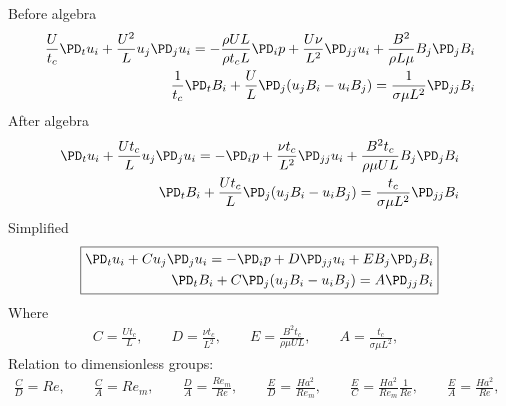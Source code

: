\documentclass[11pt]{article}
\begin{document}
Before algebra
\begin{equation}\begin{aligned}
\frac{U}{t_c} \PD_t u_i+ \frac{U^2}{L} u_j\PD_j u_i =-\frac{\rho U L}{\rho t_c L}\PD_i p+ \frac{U \nu}{L^2} \PD_{jj} u_i + \frac{B^2}{\rho L \mu} B_j \PD_j B_i \\
\frac{1}{t_c} \PD_t B_i + \frac{U}{L} \PD_j (u_j B_i - u_i B_j) = \frac{1}{\sigma \mu L^2} \PD_{jj} B_i
\end{aligned} \end{equation}
After algebra
\begin{equation}\begin{aligned}
\PD_t u_i+ \frac{U t_c}{L} u_j\PD_j u_i =-\PD_i p + \frac{\nu t_c}{L^2} \PD_{jj} u_i + \frac{B^2 t_c}{\rho \mu U L} B_j \PD_j B_i \\
\PD_t B_i + \frac{U t_c}{L} \PD_j (u_j B_i - u_i B_j) = \frac{t_c}{\sigma \mu L^2} \PD_{jj} B_i
\end{aligned} \end{equation}
Simplified
\begin{equation}\boxed{\begin{aligned}
\PD_t u_i+ C u_j\PD_j u_i = - \PD_i p+ D \PD_{jj} u_i + E B_j \PD_j B_i \\
\PD_t B_i + C \PD_j (u_j B_i - u_i B_j) = A \PD_{jj} B_i
\end{aligned}}\end{equation}
Where
\begin{equation}\boxed{\begin{aligned}
	C = \frac{U t_c}{L}, \qquad
	D = \frac{\nu t_c}{L^2}, \qquad
	E = \frac{B^2 t_c}{\rho \mu U L}, \qquad
	A = \frac{t_c}{\sigma \mu L^2}, \qquad
\end{aligned}}\end{equation}
Relation to dimensionless groups:
\begin{equation}\begin{aligned}
	\frac{C}{D} = Re, \qquad
	\frac{C}{A} = Re_m, \qquad
	\frac{D}{A} = \frac{Re_m}{Re}, \qquad
	\frac{E}{D} = \frac{Ha^2}{Re_m}, \qquad
	\frac{E}{C} = \frac{Ha^2}{Re_m} \frac{1}{Re}, \qquad
	\frac{E}{A} = \frac{Ha^2}{Re}, \qquad
\end{aligned} \end{equation}
\end{document}

